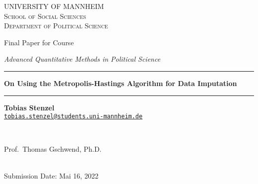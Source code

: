 \documentclass[12pt,english,a4paper,oneside]{article}
\theoremstyle{definition}
\theoremstyle{definition}
\theoremstyle{definition}
\theoremstyle{definition}
\theoremstyle{remark}
\begin{document}
\begin{titlepage}

    \begin{center}
    \large{ \textsc{ \uppercase{University of Mannheim} \\ \vspace{-0.2cm}
School of Social Sciences \\ \vspace{-0.2cm}
Department of Political Science}}

      
        \vspace{3.5cm}
        

       \large{   Final Paper for Course   }


       \large{ \textit{   Advanced Quantitative Methods in Political Science   }}

\renewcommand{\linethickness}{0.03em}
\rule{\linewidth}{\linethickness}


       \LARGE{ \textbf{   On Using the Metropolis-Hastings Algorithm for Data Imputation   }}


       \large{  }

        \vspace{-0.2cm}
\rule{\linewidth}{\linethickness}


\begin{minipage}[t]{0.5\textwidth}
\begin{flushleft}
\singlespacing
 \textbf{Tobias Stenzel}  \\ 


 \href{mailto:tobias.stenzel@students.uni-mannheim.de}{\nolinkurl{tobias.stenzel@students.uni-mannheim.de}}  \\ 

\end{flushleft}
\end{minipage}
\begin{minipage}[t]{0.4\textwidth}
\hfill
\end{minipage}\\
\vspace{0.2cm}
\begin{minipage}[t]{0.35\textwidth}
\hfill
\end{minipage}
\begin{minipage}[t]{0.55\textwidth}
\begin{flushright}
\singlespacing
     Prof.~Thomas Gschwend, Ph.D.  \\       

\end{flushright}
\end{minipage}\\
%


         \vfill
         Submission Date: Mai 16, 2022 \\ 
        





         \vfill



     \end{center}
    \thispagestyle{empty}
\end{titlepage}
\end{document}
